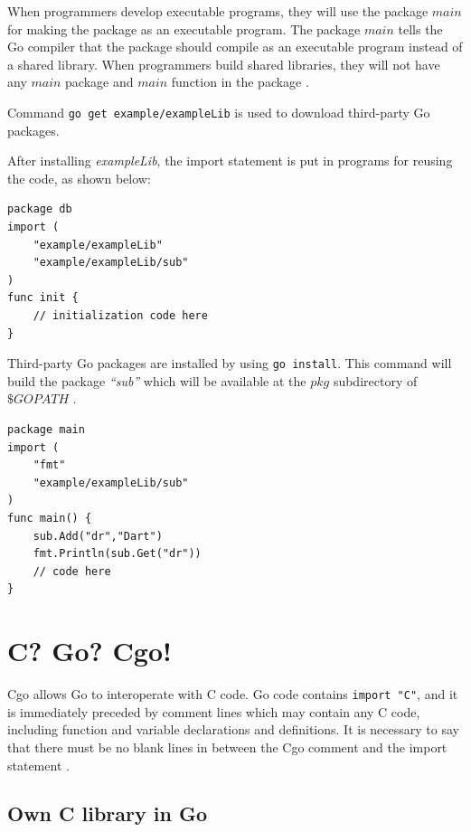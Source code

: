 \documentclass[
  12pt, 
  digital, %
  notable,   %
  nolof,     %
  nolot,     %
]{fithesis3}
\begin{document}
When programmers develop executable programs, they will use the package $main$ for making the 
package as an executable program. The package $main$ tells the Go compiler that the package 
should compile as an executable program instead of a shared library. When programmers build 
shared libraries, they will not have any $main$ package and $main$ function in the package \cite{stack_2014}.

Command \texttt{go get example/exampleLib} is used to download third-party Go packages.

After installing \textit{exampleLib}, the import statement is put in programs for reusing the 
code, as shown below:
\begin{lstlisting}
package db
import (
	"example/exampleLib"
	"example/exampleLib/sub"
)
func init {
	// initialization code here    
}
\end{lstlisting}
Third-party Go packages are installed by using \texttt{go install}. This command will build the package \textit{“sub”} which will be available at the $pkg$ subdirectory of $\$GOPATH$ \cite{kozyra_2014}.
\begin{lstlisting}
package main
import (
	"fmt"
	"example/exampleLib/sub"
)
func main() {
    sub.Add("dr","Dart")
    fmt.Println(sub.Get("dr"))
    // code here    
}
\end{lstlisting}

\section{C? Go? Cgo!}\label{cgo}
Cgo allows Go to interoperate with C code. Go code contains \texttt{import "C"}, and it is immediately preceded by comment lines which may contain any C code, including function and variable declarations and definitions. It is necessary to say that there must be no blank lines in 
between the Cgo comment and the import statement \cite{cgo-command}. 

\subsection{Own C library in Go}
\end{document}
